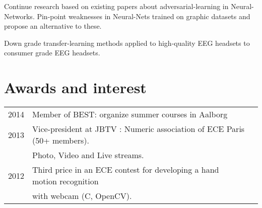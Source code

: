 \documentclass[letterpaper]{deedy-resume} %
\begin{document}
\begin{minipage}[t]{0.66\textwidth}
\sectionspace %


Continue research based on existing papers about adversarial-learning in Neural-Networks. Pin-point weaknesses in Neural-Nets trained on graphic datasets and propose an alternative to these.

\sectionspace %



Down grade transfer-learning methods applied to high-quality EEG headsets to consumer grade EEG headsets.

\sectionspace %


\section{Awards and interest} 

\begin{tabular}{rll}
2014	& Member of BEST: organize summer courses in Aalborg\\
2013	& Vice-president at JBTV : Numeric association of ECE Paris (50+ members).\\ 
		& Photo, Video and Live streams.\\
2012	& Third price in an ECE contest for developing a hand motion recognition\\
		& with webcam (C, OpenCV).\\
\end{tabular} 



\sectionspace %


\end{minipage} %

\end{document}
